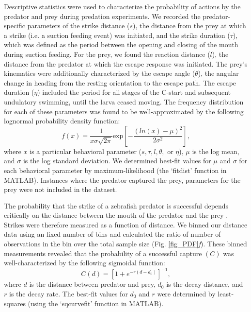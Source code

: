 \documentclass[]{rsos}%
\begin{document}
Descriptive statistics were used to characterize the probability of actions by the predator and prey during predation experiments.
We recorded the predator-specific parameters of the strike distance ($s$), the distance from the prey at which a strike (i.e. a suction feeding event) was initiated, and the strike duration ($\tau$), which was defined as the period between the opening and closing of the mouth during suction feeding. 
For the prey, we found the reaction distance ($l$), the distance from the predator at which the escape response was initiated.
The prey's kinematics were additionally characterized by the escape angle ($\theta$), the angular change in heading from the resting orientation to the escape path.
The escape duration ($\eta$) included the period for all stages of the C-start and subsequent undulatory swimming, until the larva ceased moving.
The frequency distribution for each of these parameters was found to be well-approximated by the following lognormal probability density function:
%
\begin{equation}%
f(x) = \frac{1}{x\sigma \sqrt{2 \pi}} \text{exp} \left[ -{\frac{(ln(x)-\mu)^2}{2\sigma ^2}} \right],
\label{eqn_lognorm}
\end{equation}
%
where $x$ is a particular behavioral parameter ($s, \tau, l, \theta ,$ or $\eta$), $\mu$ is the log mean, and $\sigma$ is the log standard deviation. 
We determined best-fit values for $\mu$ and $\sigma$ for each behavioral parameter by maximum-likelihood (the `fitdist' function in MATLAB).
Instances where the predator captured the prey, parameters for the prey were not included in the dataset.

The probability that the strike of a zebrafish predator is successful depends critically on the distance between the mouth of the predator and the prey \cite{Stewart:2013bha}.
Strikes were therefore measured as a function of distance.
We binned our distance data using an fixed number of bins and calculated the ratio of number of observations in the bin over the total sample size (Fig. \ref{fig_PDF}\textit{f}).
These binned measurements revealed that the probability of a successful capture $(C)$ was well-characterized by the following sigmoidal function:
%
\begin{equation}%
C(d) = \left[ 1+e^{-r(d-d_0)} \right]^{-1},
\label{eqn_sig} 
\end{equation}
%
where $d$ is the distance between predator and prey, $d_0$ is the decay distance, and $r$ is the decay rate. 
The best-fit values for $d_0$ and $r$ were determined by least-squares (using the `sqcurvefit' function in MATLAB).
\end{document}
